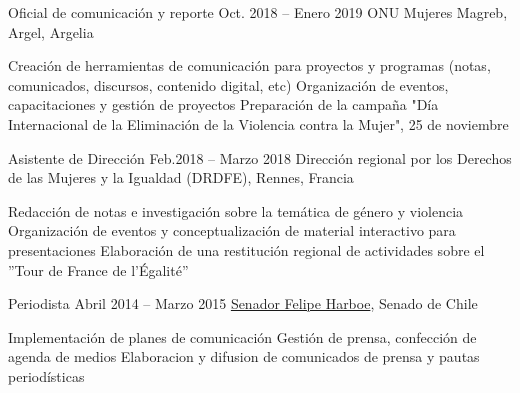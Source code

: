 \begin{joblist}
\item[Oficial de comunicación y reporte]{Oct. 2018 -- Enero 2019 }     
	{
	ONU Mujeres Magreb, Argel, Argelia
	}     
	{
		\normalsize{
		\vspace{-0.5cm}
		\begin{itemize}
			  \iftbftiny \setlength\itemsep{-3pt} \fi
			  \cvitem[\checkmark] Creación de herramientas de comunicación para proyectos y programas (notas, comunicados, discursos, contenido digital, etc)
 			  \cvitem[\checkmark] Organización de eventos, capacitaciones y gestión de proyectos                                          
			  \cvitem[\checkmark] Preparación de la campaña "Día Internacional de la Eliminación de la Violencia contra la Mujer", 25 de noviembre
		\end{itemize}      
        }
	}


\item[Asistente de Dirección]{Feb.2018 -- Marzo 2018 }     
	{
	\tbflogo{../Figure/logo/drdfe_128.png}
	Dirección regional por los Derechos de las Mujeres y la Igualdad (DRDFE), Rennes, Francia
	}     
	{
		\normalsize{            		
		\iftbftiny \vspace{-0.5cm} \fi
		\begin{itemize}
			  \iftbftiny \setlength\itemsep{-3pt} \fi
			  \cvitem[\checkmark] Redacción de notas e investigación sobre la temática de género y violencia
			  \cvitem[\checkmark] Organización de eventos y conceptualización de material interactivo para presentaciones 
			  \cvitem[\checkmark] Elaboración de una restitución regional de actividades sobre el ''Tour de France de l'Égalité''
		\end{itemize}      
        }
	}



\item[Periodista ]{Abril 2014 -- Marzo 2015}
     {
     \href{https://www.harboe.cl/}{Senador Felipe Harboe}, Senado de Chile
     } 
	 {
		\normalsize{
		\iftbftiny \vspace{-0.5cm} \fi
			\begin{itemize}
			  \iftbftiny \setlength\itemsep{-3pt} \fi
			  \cvitem[\checkmark] Implementación de planes de comunicación
			  \cvitem[\checkmark] Gestión de prensa, confección de agenda de medios
			  \cvitem[\checkmark] Elaboracion y difusion de comunicados de prensa y pautas periodísticas
			  

\end{itemize}}}
\end{joblist}
